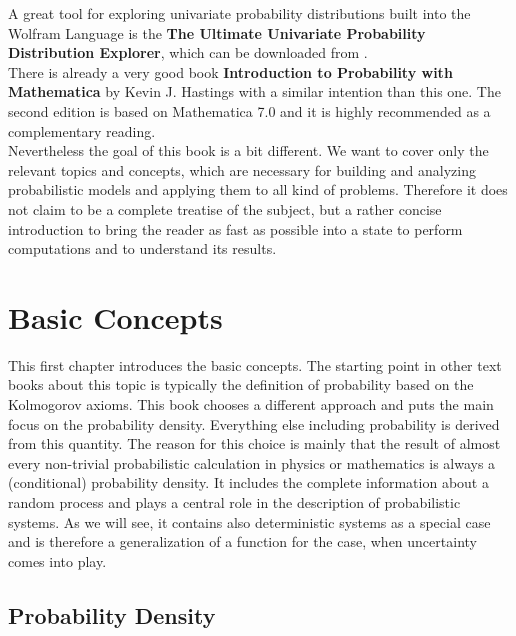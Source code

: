\documentclass{tstextbook}
\begin{document}
A great tool for exploring univariate probability distributions built into the Wolfram Language is the \textbf{The Ultimate Univariate Probability Distribution Explorer}, which can be downloaded from \cite{marichev2013}.\\

There is already a very good book \textbf{Introduction to Probability with Mathematica} by Kevin J. Hastings \cite{hastings2001} with a similar intention than this one. The second edition is based on Mathematica 7.0 and it is highly recommended as a complementary reading.\\

Nevertheless the goal of this book is a bit different. We want to cover only the relevant topics and concepts, which are necessary for building and analyzing probabilistic models and applying them to all kind of problems. Therefore it does not claim to be a complete treatise of the subject, but a rather concise introduction to bring the reader as fast as possible into a state to perform computations and to understand its results.    

\chapter{Basic Concepts}

\begin{summary}
  This first chapter introduces the basic concepts. The starting point in other text books about this topic is typically the definition of probability based on the Kolmogorov axioms. This book chooses a different approach and puts the main focus on the probability density. Everything else including probability is derived from this quantity. The reason for this choice is mainly that the result of almost every non-trivial probabilistic calculation in physics or mathematics is always a (conditional) probability density. It includes the complete information about a random process and plays a central role in the description of probabilistic systems. As we will see, it contains also deterministic systems as a special case and is therefore a generalization of a function for the case, when uncertainty comes into play.     
\end{summary}

\section{Probability Density}
\end{document}
